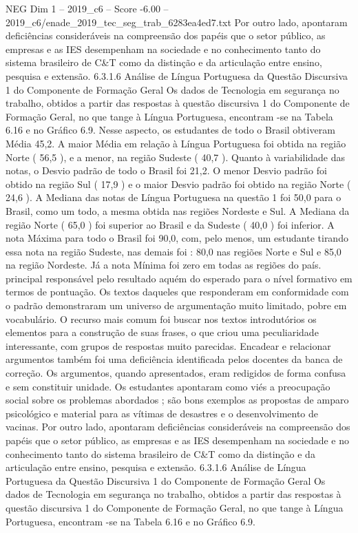 \begin{textsample}{NEG Dim 1 – 2019\_c6 – Score -6.00 – 2019\_c6/enade\_2019\_tec\_seg\_trab\_6283ea4ed7.txt}
Por outro lado, apontaram deficiências consideráveis na compreensão dos papéis que o setor público, as empresas e as IES desempenham na sociedade e no conhecimento tanto do sistema brasileiro de C\&T como da distinção e da articulação entre ensino, pesquisa e extensão. 6.3.1.6 Análise de Língua Portuguesa da Questão Discursiva 1 do Componente de Formação Geral Os dados de Tecnologia em segurança no trabalho, obtidos a partir das respostas à questão discursiva 1 do Componente de Formação Geral, no que tange à Língua Portuguesa, encontram -se na Tabela 6.16 e no Gráfico 6.9.
Nesse aspecto, os estudantes de todo o Brasil obtiveram Média 45,2.
A maior Média em relação à Língua Portuguesa foi obtida na região Norte ( 56,5 ), e a menor, na região Sudeste ( 40,7 ).
Quanto à variabilidade das notas, o Desvio padrão de todo o Brasil foi 21,2.
O menor Desvio padrão foi obtido na região Sul ( 17,9 ) e o maior Desvio padrão foi obtido na região Norte ( 24,6 ).
A Mediana das notas de Língua Portuguesa na questão 1 foi 50,0 para o Brasil, como um todo, a mesma obtida nas regiões Nordeste e Sul.
A Mediana da região Norte ( 65,0 ) foi superior ao Brasil e da Sudeste ( 40,0 ) foi inferior.
A nota Máxima para todo o Brasil foi 90,0, com, pelo menos, um estudante tirando essa nota na região Sudeste, nas demais foi : 80,0 nas regiões Norte e Sul e 85,0 na região Nordeste.
Já a nota Mínima foi zero em todas as regiões do país. principal responsável pelo resultado aquém do esperado para o nível formativo em termos de pontuação.
Os textos daqueles que responderam em conformidade com o padrão demonstraram um universo de argumentação muito limitado, pobre em vocabulário.
O recurso mais comum foi buscar nos textos introdutórios os elementos para a construção de suas frases, o que criou uma peculiaridade interessante, com grupos de respostas muito parecidas.
Encadear e relacionar argumentos também foi uma deficiência identificada pelos docentes da banca de correção.
Os argumentos, quando apresentados, eram redigidos de forma confusa e sem constituir unidade.
Os estudantes apontaram como viés a preocupação social sobre os problemas abordados ; são bons exemplos as propostas de amparo psicológico e material para as vítimas de desastres e o desenvolvimento de vacinas.
Por outro lado, apontaram deficiências consideráveis na compreensão dos papéis que o setor público, as empresas e as IES desempenham na sociedade e no conhecimento tanto do sistema brasileiro de C\&T como da distinção e da articulação entre ensino, pesquisa e extensão. 6.3.1.6 Análise de Língua Portuguesa da Questão Discursiva 1 do Componente de Formação Geral Os dados de Tecnologia em segurança no trabalho, obtidos a partir das respostas à questão discursiva 1 do Componente de Formação Geral, no que tange à Língua Portuguesa, encontram -se na Tabela 6.16 e no Gráfico 6.9.

\end{textsample}
